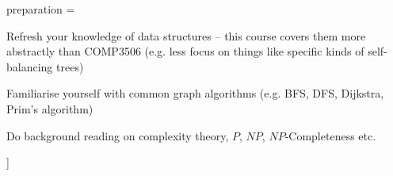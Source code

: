 preparation = {
    \item Refresh your knowledge of data structures -- this course covers them more abstractly than COMP3506 (e.g. less focus on things like specific kinds of self-balancing trees)
    \item Familiarise yourself with common graph algorithms (e.g. BFS, DFS, Dijkstra, Prim's algorithm)
    \item Do background reading on complexity theory, $ P $, $ NP $, $ NP $-Completeness etc.
}]{}
